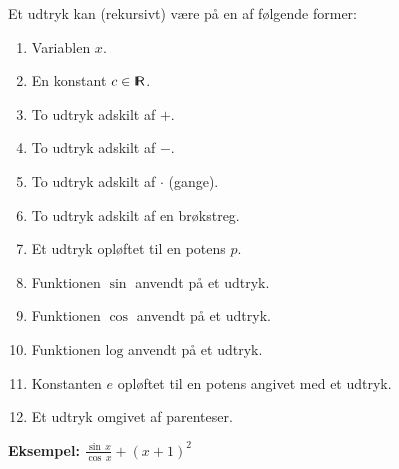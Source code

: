 \documentclass[rgb]{beamer}
\renewcommand{\log}{\ensuremath{\mathrm{log}}}
\begin{document}
\begin{frame}[fragile]
\begin{footnotesize}

  \vspace{1ex}

  Et udtryk kan (rekursivt) være på en af følgende former:

  \vspace{1ex}
  \begin{enumerate}
\item Variablen $x$.
\item En konstant $c \in \textsf{I\!R}$.
\item To udtryk adskilt af $+$.
\item To udtryk adskilt af $-$.
\item To udtryk adskilt af $\cdot$ (gange).
\item To udtryk adskilt af en brøkstreg.
\item Et udtryk opløftet til en potens $p$.
\item Funktionen $\sin$ anvendt på et udtryk.
\item Funktionen $\cos$ anvendt på et udtryk.
\item Funktionen $\log$ anvendt på et udtryk.
\item Konstanten $e$ opløftet til en potens angivet med et udtryk.
\item Et udtryk omgivet af parenteser.
\end{enumerate}

\vspace{1ex}
\textbf{Eksempel:} {\large $\frac{\sin\,x}{\cos\,x}+(x+1)^2$}

\end{footnotesize}
\end{frame}
\end{document}
